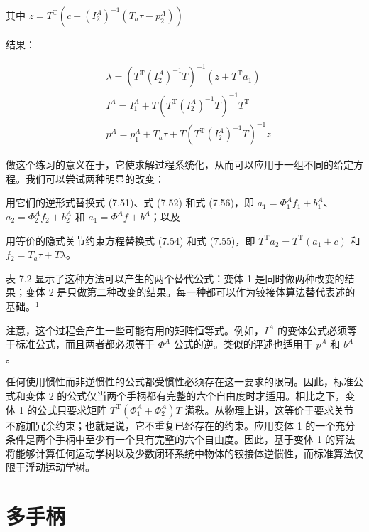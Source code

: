 \documentclass[10pt,a4paper]{book}
\theoremstyle{thmstyle} %
\theoremstyle{defstyle} %
\theoremstyle{prostyle} %
\begin{document}
其中 $z = T^{\mathrm{T}}(c - (I_{2}^{A})^{-1}(T_{a}\tau - p_{2}^{A}))$



结果：



$$
\begin{array}{rl} & { \lambda = ( T ^{\mathrm { T} } ( I _ { 2 } ^{A} ) ^{- 1} T ) ^{- 1} ( z + T ^{\mathrm { T} } a _ { 1 } ) } \\& { I ^{A} = I _ { 1 } ^{A} + T ( T ^{\mathrm { T} } ( I _ { 2 } ^{A} ) ^{- 1} T ) ^{- 1} T ^{\mathrm { T} } } \\& { p ^{A} = p _ { 1 } ^{A} + T _ { a } \tau + T ( T ^{\mathrm { T} } ( I _ { 2 } ^{A} ) ^{- 1} T ) ^{- 1} z } \end{array}
$$



做这个练习的意义在于，它使求解过程系统化，从而可以应用于一组不同的给定方程。我们可以尝试两种明显的改变：



用它们的逆形式替换式 (7.51)、式 (7.52) 和式 (7.56)，即 $a_{1}=\Phi_{1}^{A}f_{1}+b_{1}^{A}$、$a_{2}=\Phi_{2}^{A}f_{2}+b_{2}^{A}$ 和 $a_{1}=\Phi^{A}f+b^{A}$；以及



用等价的隐式关节约束方程替换式 (7.54) 和式 (7.55)，即 $T^{\mathrm{T}}a_{2}=T^{\mathrm{T}}(a_{1}+c)$ 和 $f_{2}=T_{a}\tau+T\lambda$。



表 7.2 显示了这种方法可以产生的两个替代公式：变体 1 是同时做两种改变的结果；变体 2 是只做第二种改变的结果。每一种都可以作为铰接体算法替代表述的基础。$^{1}$



注意，这个过程会产生一些可能有用的矩阵恒等式。例如，$I^{A}$ 的变体公式必须等于标准公式，而且两者都必须等于 $\Phi^{A}$ 公式的逆。类似的评述也适用于 $p^{A}$ 和 $b^{A}$。



任何使用惯性而非逆惯性的公式都受惯性必须存在这一要求的限制。因此，标准公式和变体 2 的公式仅当两个手柄都有完整的六个自由度时才适用。相比之下，变体 1 的公式只要求矩阵 $T^{\mathrm{T}}(\Phi_{1}^{A}+\Phi_{2}^{A})T$ 满秩。从物理上讲，这等价于要求关节不施加冗余约束；也就是说，它不重复已经存在的约束。应用变体 1 的一个充分条件是两个手柄中至少有一个具有完整的六个自由度。因此，基于变体 1 的算法将能够计算任何运动学树以及少数闭环系统中物体的铰接体逆惯性，而标准算法仅限于浮动运动学树。



\section{多手柄}
\end{document}
